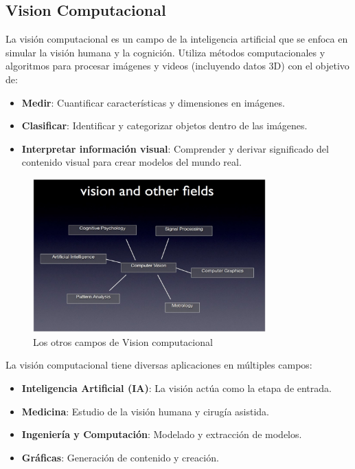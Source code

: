 
 \subsection{Vision Computacional \citep*{vc1}}
La visión computacional es un campo de la inteligencia artificial que se enfoca en simular la visión humana y la cognición. Utiliza métodos computacionales y algoritmos para procesar imágenes y videos (incluyendo datos 3D) con el objetivo de:


\begin{itemize}
	\item \textbf{Medir}: Cuantificar características y dimensiones en imágenes.
	\item \textbf{Clasificar}: Identificar y categorizar objetos dentro de las imágenes.
	\item \textbf{Interpretar información visual}: Comprender y derivar significado del contenido visual para crear modelos del mundo real.
\end{itemize}

\begin{figure}[H]
	\begin{center}
		\includegraphics[width=0.8\textwidth]{2/figures/vc1.jpeg}
		\caption{Los otros campos de Vision computacional}
		\label{}
	\end{center}
	
\end{figure}
	
	La visión computacional tiene diversas aplicaciones en múltiples campos:
	
\begin{itemize}
	\item \textbf{Inteligencia Artificial (IA)}: La visión actúa como la etapa de entrada.
	\item \textbf{Medicina}: Estudio de la visión humana y cirugía asistida.
	\item \textbf{Ingeniería y Computación}: Modelado y extracción de modelos.
	\item \textbf{Gráficas}: Generación de contenido y creación.
\end{itemize}
	
